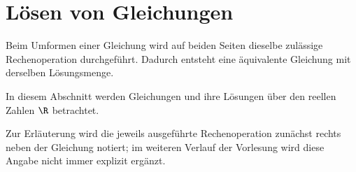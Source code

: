 \section{Lösen von Gleichungen}
\label{sec:fundamentals_solving_equations}

Beim Umformen einer Gleichung wird auf beiden Seiten dieselbe zulässige
Rechenoperation durchgeführt. Dadurch entsteht eine äquivalente Gleichung mit
derselben Lösungsmenge.

In diesem Abschnitt werden Gleichungen und ihre Lösungen über den reellen
Zahlen $\R$ betrachtet.

Zur Erläuterung wird die jeweils ausgeführte Rechenoperation zunächst rechts
neben der Gleichung notiert; im weiteren Verlauf der Vorlesung wird diese
Angabe nicht immer explizit ergänzt.




